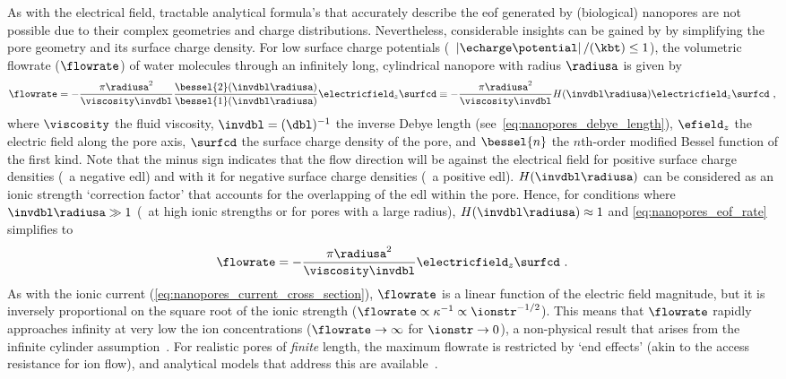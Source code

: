 As with the electrical field, tractable analytical formula's that accurately describe the \gls{eof} generated
by (biological) nanopores are not possible due to their complex geometries and charge distributions.
Nevertheless, considerable insights can be gained by by simplifying the pore geometry and its surface charge
density. For low surface charge potentials (\ie~$\left| \echarge \potential\right| / (\kbt) \le 1$), the
volumetric flowrate ($\flowrate$) of water molecules through an infinitely long, cylindrical nanopore with
radius $\radiusa$ is given by~\cite{Laohakunakorn-2015}
%
\begin{equation}\label{eq:nanopores_eof_rate}
  \flowrate = - \dfrac{\pi \radiusa^2}{\viscosity \invdbl} 
  \dfrac{ \bessel{2} ( \invdbl \radiusa ) }{ \bessel{1} (\invdbl \radiusa) }
  \electricfield_z \surfcd
  \equiv - \dfrac{\pi \radiusa^2}{\viscosity \invdbl} H(\invdbl \radiusa) \electricfield_z \surfcd
  \text{ ,}
\end{equation}
%
where $\viscosity$ the fluid viscosity, $\invdbl = (\dbl)^{-1}$ the inverse Debye length
(see~\cref{eq:nanopores_debye_length}), $\efield_z$ the electric field along the pore axis, $\surfcd$ the surface charge
density of the pore, and $\bessel{n}$ the $n$th-order modified Bessel function of the first kind. Note that
the minus sign indicates that the flow direction will be against the electrical field for positive surface
charge densities (\ie~a negative \gls{edl}) and with it for negative surface charge densities (\ie~a positive
\gls{edl}). $H(\invdbl \radiusa)$ can be considered as an ionic strength `correction factor' that accounts for
the overlapping of the \gls{edl} within the pore. Hence, for conditions where $\invdbl \radiusa \gg 1$ (\eg~at
high ionic strengths or for pores with a large radius), $H(\invdbl \radiusa) \approx 1$ and
\cref{eq:nanopores_eof_rate} simplifies to
%
\begin{equation}\label{eq:nanopores_eof_rate_simple}
  \flowrate = - \dfrac{\pi \radiusa^2}{\viscosity \invdbl} \electricfield_z \surfcd
  \text{ .}
\end{equation}
%
As with the ionic current (\cref{eq:nanopores_current_cross_section}), $\flowrate$ is a linear function of the
electric field magnitude, but it is inversely proportional on the square root of the ionic strength
($\flowrate \propto \kappa^{-1} \propto \ionstr^{-1/2}$). This means that $\flowrate$ rapidly approaches
infinity at very low the ion concentrations  ($\flowrate \to \infty$ for $\ionstr \to 0$), a non-physical
result that arises from the infinite cylinder assumption~\cite{Mao-2014}. For realistic pores of \emph{finite}
length, the maximum flowrate is restricted by `end effects' (akin to the access resistance for ion flow), and
analytical models that address this are available~\cite{Sherwood-2014}.

